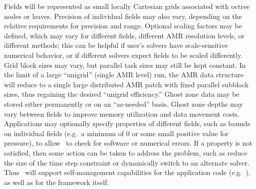 \documentclass[11pt,letterpaper]{article}
\begin{document}
%
Fields will be represented as small locally Cartesian grids associated
with octree nodes or leaves.  
%
Precision of individual fields may also vary, depending
on the relative requirements for precision and range.
%
Optional scaling factors may be defined, which may vary for
different fields, different AMR resolution levels, or different
methods; this can be helpful if user's solvers have scale-sensitive
numerical behavior, or if different solvers expect fields to be scaled
differently.  
%
Grid block sizes may vary, but parallel
task sizes may still be kept constant.  In the limit of a large ``unigrid'' (single
AMR level) run, the AMR data structure will reduce to a single large
distributed AMR patch with fixed parallel subblock sizes, thus regaining the desired
``unigrid efficiency.''
Ghost zone data may be stored either permanently or on an
``as-needed'' basis.  Ghost zone depths may vary between fields to
improve memory utilization and data movement costs.
%
Applications may optionally specify properties of different fields, such as
bounds on individual fields (e.g.~a minimum of $0$ or some small
positive value for pressure), to allow \cello\ to check for software
or numerical errors.   
If a property is not satisfied, then some action can be taken to
address the problem, such as reduce the size of the time step
constraint or dynamically switch to an alternate solver.  Thus \cello\ will
support self-management capabilities for the application code (e.g.~\enzoii),
as well as for the framework itself.
\end{document}
